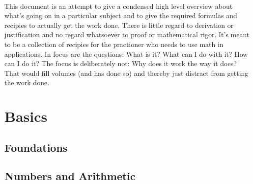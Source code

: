 \documentclass[12pt]{article}  %
\begin{document}
\paragraph{}
This document is an attempt to give a condensed high level overview about what's going on in a particular subject and to give the required formulas and recipies to actually get the work done. There is little regard to derivation or justification and no regard whatsoever to proof or mathematical rigor. It's meant to be a collection of recipies for the practioner who needs to use math in applications. In focus are the questions: What is it? What can I do with it? How can I do it? The focus is deliberately not: Why does it work the way it does? That would fill volumes (and has done so) and thereby just distract from getting the work done.

\section{Basics}
\subsection{Foundations} 
  
\subsection{Numbers and Arithmetic} 
 
\end{document}

